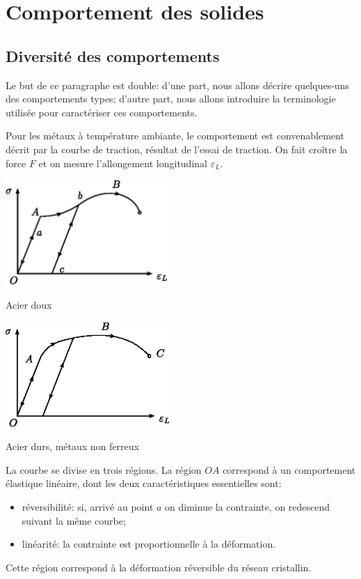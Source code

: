 \section{Comportement des solides} \label{sec:Ch04-2}
\subsection{Diversité des comportements} \label{ssec:Ch04-2.1}
Le but de ce paragraphe est double: d'une part, nous allons décrire quelques-uns des comportements types; d'autre part, nous allons introduire la terminologie utilisée pour caractériser ces comportements.

Pour les métaux à température ambiante, le comportement est convenablement décrit par la courbe de traction, résultat de l'essai de traction.
On fait croître la force $F$ et on mesure l'allongement longitudinal $\varepsilon_L$.
\begin{multicols}{2}
    \begin{center}
        \includegraphics[height=4cm]{../images/T1_Ch04-0011}

        Acier doux
    \end{center}
    \columnbreak
    \begin{center}
        \includegraphics[height=4cm]{../images/T1_Ch04-0012}

        Acier durs, métaux non ferreux
    \end{center}
\end{multicols}
La courbe se divise en trois régions.
La région $OA$ correspond à un comportement élastique linéaire, dont les deux caractéristiques essentielles sont:
\begin{itemize}
    \item réversibilité: si, arrivé au point $a$ on diminue la contrainte, on redescend suivant la même courbe;
    \item linéarité: la contrainte est proportionnelle à la déformation. 
\end{itemize}
Cette région correspond à la déformation réversible du réseau cristallin. 


